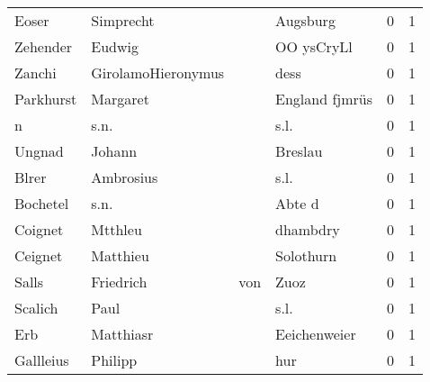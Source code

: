 \begin{center}
\begin{tiny}
\begin{longtabu}{llllrr}
                    Eoser &                          Simprecht &             &                                    Augsburg &          0 &         1 \\
                 Zehender &                             Eudwig &             &                                  OO ysCryLl &          0 &         1 \\
                   Zanchi &                 GirolamoHieronymus &             &                                        dess &          0 &         1 \\
                Parkhurst &                           Margaret &             &                              England fjmrüs &          0 &         1 \\
                        n &                               s.n. &             &                                        s.l. &          0 &         1 \\
                   Ungnad &                             Johann &             &                                     Breslau &          0 &         1 \\
                    Blrer &                          Ambrosius &             &                                        s.l. &          0 &         1 \\
                 Bochetel &                               s.n. &             &                                      Abte d &          0 &         1 \\
                  Coignet &                            Mtthleu &             &                                    dhambdry &          0 &         1 \\
                  Ceignet &                           Matthieu &             &                                   Solothurn &          0 &         1 \\
                    Salls &                          Friedrich &         von &                                        Zuoz &          0 &         1 \\
                  Scalich &                               Paul &             &                                        s.l. &          0 &         1 \\
                      Erb &                          Matthiasr &             &                                Eeichenweier &          0 &         1 \\
                Gallleius &                            Philipp &             &                                         hur &          0 &         1 \\

\end{longtabu}
\end{tiny}
\end{center}
